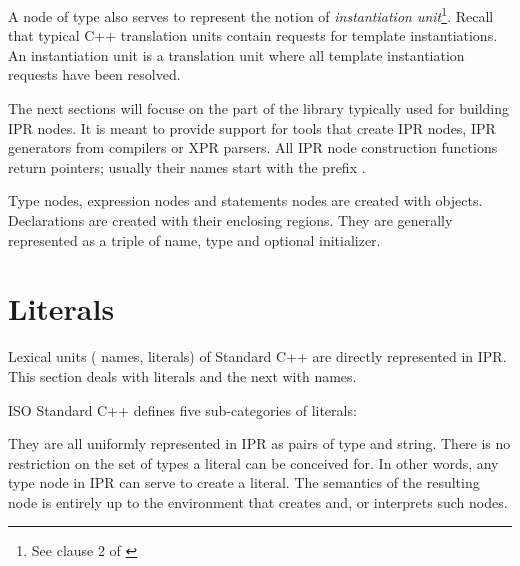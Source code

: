 \documentclass[11pt]{article}
\begin{document}
A node of type  also serves to represent the notion of 
\emph{instantiation unit}\footnote{See clause 2 of \cite{iso98, iso03}}.
Recall that typical C++ translation units contain requests for template
instantiations.  An instantiation unit is a translation unit where all
template instantiation requests have been resolved.


The next sections will focuse on the part of the library typically used for
building IPR nodes.  It is meant to provide support for tools that create IPR
nodes, \eg{} IPR generators from compilers or XPR parsers.  All IPR
node construction functions return pointers; usually their names start with
the prefix .  

Type nodes, expression nodes and statements nodes are created with
 objects.  Declarations are created with their enclosing
regions.  They are generally represented as a triple of name, type and
optional initializer.


\section{Literals}
\label{sec:literals}

Lexical units (\eg{} names, literals) of Standard C++ are directly represented
in IPR. This section deals with literals and the next with names.

ISO Standard C++ defines five sub-categories of literals:
\begin{Grammar}
\end{Grammar}
They are all uniformly represented in IPR as pairs of type and string.
There is no restriction on the set of types a literal can be conceived for.
In other words, any type node in IPR can serve to create a literal.  The
semantics of the resulting node is entirely up to the environment that creates
and, or interprets such nodes. 

\end{document}

